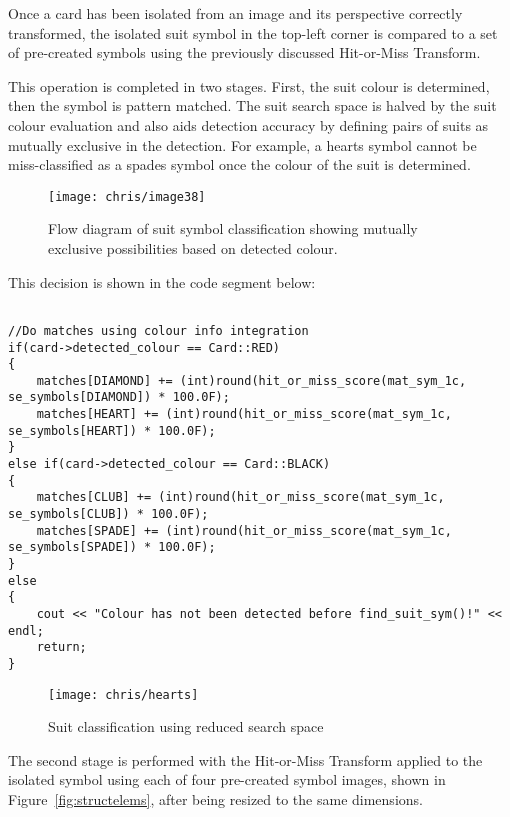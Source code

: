 		Once a card has been isolated from an image and its perspective correctly transformed, the isolated suit symbol in the top-left corner is compared to a set of pre-created symbols using the previously discussed Hit-or-Miss Transform.

		This operation is completed in two stages. First, the suit colour is determined, then the symbol is pattern matched. The suit search space is halved by the suit colour evaluation and also aids detection accuracy by defining pairs of suits as mutually exclusive in the detection. For example, a hearts symbol cannot be miss-classified as a spades symbol once the colour of the suit is determined.

		\begin{figure}[H]
			\centering
			\texttt{[image: chris/image38]}
			\caption{Flow diagram of suit symbol classification showing mutually exclusive possibilities based on detected colour.}
		\end{figure}

		This decision is shown in the code segment below:

		\begin{lstlisting}

//Do matches using colour info integration
if(card->detected_colour == Card::RED)
{
	matches[DIAMOND] += (int)round(hit_or_miss_score(mat_sym_1c, se_symbols[DIAMOND]) * 100.0F);
	matches[HEART] += (int)round(hit_or_miss_score(mat_sym_1c, se_symbols[HEART]) * 100.0F);
}
else if(card->detected_colour == Card::BLACK)
{
	matches[CLUB] += (int)round(hit_or_miss_score(mat_sym_1c, se_symbols[CLUB]) * 100.0F);
	matches[SPADE] += (int)round(hit_or_miss_score(mat_sym_1c, se_symbols[SPADE]) * 100.0F);
}
else
{
	cout << "Colour has not been detected before find_suit_sym()!" << endl;
	return;
}
		\end{lstlisting}

		\begin{figure}[H]
			\centering
			\texttt{[image: chris/hearts]}
			\caption{Suit classification using reduced search space}
			\label{fig:hearts}
		\end{figure}

		The second stage is performed with the Hit-or-Miss Transform applied to the isolated symbol  using each of four pre-created symbol images, shown in Figure~\ref{fig:structelems}, after being resized to the same dimensions.

